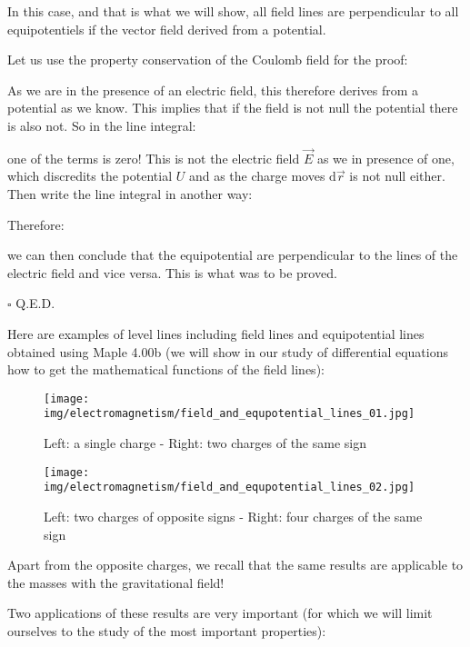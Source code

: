 	\begin{theorem}
	In this case, and that is what we will show, all field lines are perpendicular to all equipotentiels if the vector field derived from a potential.
	\end{theorem}
	Let us use the property conservation of the Coulomb field for the proof:
	\begin{dem}
	
	As we are in the presence of an electric field, this therefore derives from a potential as we know. This implies that if the field is not null the potential there is also not. So in the line integral:
	
	one of the terms is zero! This is not the electric field $\vec{E}$ as we in presence of one, which discredits the potential $U$ and as the charge moves $\mathrm{d}\vec{r}$ is not null either. Then write the line integral in another way:
	
	Therefore:
	
	we can then conclude that the equipotential are perpendicular to the lines of the electric field and vice versa. This is what was to be proved.
	\begin{flushright}
		$\square$  Q.E.D.
	\end{flushright}
	\end{dem}
	Here are examples of level lines including field lines and equipotential lines obtained using Maple 4.00b (we will show in our study of differential equations how to get the mathematical functions of the field lines):
	\begin{figure}[H]
		\centering
		\texttt{[image: img/electromagnetism/field\_and\_equpotential\_lines\_01.jpg]}
		\caption{Left: a single charge - Right: two charges of the same sign}
		\texttt{[image: img/electromagnetism/field\_and\_equpotential\_lines\_02.jpg]}
		\caption{Left: two charges of opposite signs - Right: four charges of the same sign}
	\end{figure}
	\begin{tcolorbox}[title=Remark,colframe=black,arc=10pt]
	Apart from the opposite charges, we recall that the same results are applicable to the masses with the gravitational field!
	\end{tcolorbox}
	Two applications of these results are very important (for which we will limit ourselves to the study of the most important properties):
